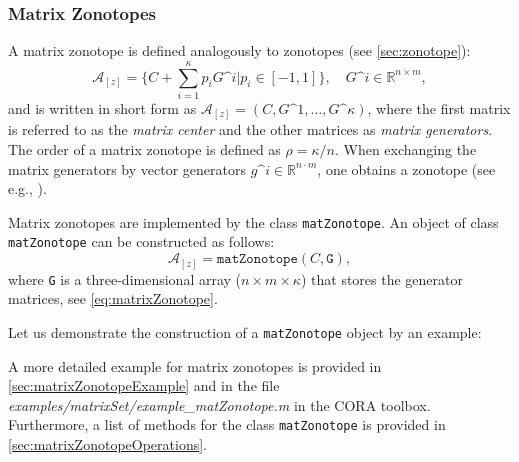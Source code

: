 \subsubsection{Matrix Zonotopes} \label{sec:zonotopeMatrix}

A matrix zonotope is defined analogously to zonotopes (see \cref{sec:zonotope}):
\begin{equation}\label{eq:matrixZonotope}
	\mathcal{A}_{[z]}=\Big\{ C+\sum_{i=1}^{\kappa} p_i G\^{i} \Big| p_i \in [-1,1] \Big\}, \quad G\^{i}\in\mathbb{R}^{n \times m},
\end{equation}
and is written in short form as $\mathcal{A}_{[z]}=(C, G\^1, \ldots , G\^\kappa)$,
where the first matrix is referred to as the \textit{matrix center} and the other matrices as \textit{matrix generators}.
The order of a matrix zonotope is defined as $\rho = \kappa/n$. When exchanging the matrix generators by vector generators $g\^{i}\in \mathbb{R}^{n\cdot m}$,
one obtains a zonotope (see e.g., \cite{Girard2005}).

Matrix zonotopes are implemented by the class \texttt{matZonotope}. An object of class \texttt{matZonotope} can be constructed as follows:
\begin{equation*}
	\mathcal{A}_{[z]} = \texttt{matZonotope}(C,\texttt{G}),
\end{equation*}
where \texttt{G} is a three-dimensional array ($n\times m\times \kappa$) that stores the generator matrices, see \eqref{eq:matrixZonotope}.

\newpage
Let us demonstrate the construction of a \texttt{matZonotope} object by an example:

\begin{center}
\begin{minipage}[t]{0.40\textwidth}
	\footnotesize
	
\end{minipage}
\end{center}

A more detailed example for matrix zonotopes is provided in \cref{sec:matrixZonotopeExample} and in the file \textit{examples/matrixSet/example\_matZonotope.m} in the CORA toolbox. Furthermore, a list of methods for the class \texttt{matZonotope} is provided in \cref{sec:matrixZonotopeOperations}.
